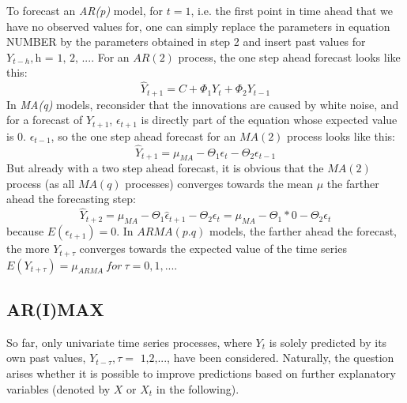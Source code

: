 \documentclass[a4paper, 11pt]{article}
\begin{document}
To forecast an \textit{AR(p)} model, for $t = 1$, i.e. the first point in time ahead that we have no observed values for, one can simply replace the parameters in equation NUMBER by the parameters obtained in step 2 and insert past values for $Y_{t-h}, \text{h = 1, 2, ...}$. For an $AR(2)$ process, the one step ahead forecast looks like this:
\begin{equation}
	\hat{Y}_{t+1} = C + \Phi_{1}Y_{t} + \Phi_{2}Y_{t-1}
\end{equation}
In \textit{MA(q)} models, reconsider that the innovations are caused by white noise, and for a forecast of $Y_{t+1}$, $\epsilon_{t+1}$ is directly part of the equation whose expected value is 0.  $\epsilon_{t-1}$, so the one step ahead forecast for an $MA(2)$ process looks like this:
\begin{equation}
\hat{Y}_{t+1} = \mu_{MA}  - \Theta_{1}\epsilon_{t}  - \Theta_{2}\epsilon_{t-1}
\end{equation}
But already with a two step ahead forecast, it is obvious that the $MA(2)$ process (as all $MA(q)$ processes) converges towards the mean $\mu$ the farther ahead the forecasting step:
\begin{equation}
\hat{Y}_{t+2} = \mu_{MA}  - \Theta_{1}\hat{\epsilon}_{t+1}  - \Theta_{2}\epsilon_{t} = \mu_{MA} - \Theta_{1} * 0 - \Theta_{2}\epsilon_{t}
\end{equation}
because $E(\epsilon_{t+1}) = 0$.
In $ARMA(p.q)$ models, the farther ahead the forecast, the more $Y_{t+\tau}$ converges towards the expected value of the time series $E(Y_{t+\tau}) = \mu_{ARMA} \ for \ \tau = 0, 1, ...$.\\

\subsection{AR(I)MAX}
 
So far, only univariate time series processes, where $Y_{t}$ is solely predicted by its own past values, $Y_{t-\tau}, \tau = \text{ 1,2,...}$, have been considered. Naturally, the question arises whether it is possible to improve predictions based on further explanatory variables (denoted by $X$ or $X_{t}$ in the following). 
\\
\end{document}
